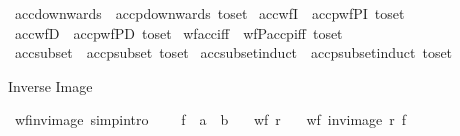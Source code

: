 \begin{isabellebody}
\isamarkupfalse%
\ acc{\isacharunderscore}{\kern0pt}downwards\ {\isacharequal}{\kern0pt}\ accp{\isacharunderscore}{\kern0pt}downwards\ {\isacharbrackleft}{\kern0pt}to{\isacharunderscore}{\kern0pt}set{\isacharbrackright}{\kern0pt}\isanewline
{}\isamarkupfalse%
\ acc{\isacharunderscore}{\kern0pt}wfI\ {\isacharequal}{\kern0pt}\ accp{\isacharunderscore}{\kern0pt}wfPI\ {\isacharbrackleft}{\kern0pt}to{\isacharunderscore}{\kern0pt}set{\isacharbrackright}{\kern0pt}\isanewline
{}\isamarkupfalse%
\ acc{\isacharunderscore}{\kern0pt}wfD\ {\isacharequal}{\kern0pt}\ accp{\isacharunderscore}{\kern0pt}wfPD\ {\isacharbrackleft}{\kern0pt}to{\isacharunderscore}{\kern0pt}set{\isacharbrackright}{\kern0pt}\isanewline
{}\isamarkupfalse%
\ wf{\isacharunderscore}{\kern0pt}acc{\isacharunderscore}{\kern0pt}iff\ {\isacharequal}{\kern0pt}\ wfP{\isacharunderscore}{\kern0pt}accp{\isacharunderscore}{\kern0pt}iff\ {\isacharbrackleft}{\kern0pt}to{\isacharunderscore}{\kern0pt}set{\isacharbrackright}{\kern0pt}\isanewline
{}\isamarkupfalse%
\ acc{\isacharunderscore}{\kern0pt}subset\ {\isacharequal}{\kern0pt}\ accp{\isacharunderscore}{\kern0pt}subset\ {\isacharbrackleft}{\kern0pt}to{\isacharunderscore}{\kern0pt}set{\isacharbrackright}{\kern0pt}\isanewline
{}\isamarkupfalse%
\ acc{\isacharunderscore}{\kern0pt}subset{\isacharunderscore}{\kern0pt}induct\ {\isacharequal}{\kern0pt}\ accp{\isacharunderscore}{\kern0pt}subset{\isacharunderscore}{\kern0pt}induct\ {\isacharbrackleft}{\kern0pt}to{\isacharunderscore}{\kern0pt}set{\isacharbrackright}{\kern0pt}%
\isadelimdocument
%
\endisadelimdocument
%
\isatagdocument
%
\isamarkuptrue%
%
\endisatagdocument
{\isafolddocument}%
%
\isadelimdocument
%
\endisadelimdocument
%
\begin{isamarkuptext}%
Inverse Image%
\end{isamarkuptext}\isamarkuptrue%
\isamarkupfalse%
\ wf{\isacharunderscore}{\kern0pt}inv{\isacharunderscore}{\kern0pt}image\ {\isacharbrackleft}{\kern0pt}simp{\isacharcomma}{\kern0pt}intro{\isacharbang}{\kern0pt}{\isacharbrackright}{\kern0pt}{\isacharcolon}{\kern0pt}\ \isanewline
\ \ \ f\ {\isacharcolon}{\kern0pt}{\isacharcolon}{\kern0pt}\ {\isachardoublequoteopen}{\isacharprime}{\kern0pt}a\ {\isasymRightarrow}\ {\isacharprime}{\kern0pt}b{\isachardoublequoteclose}\isanewline
\ \ \ {\isachardoublequoteopen}wf\ r{\isachardoublequoteclose}\isanewline
\ \ \ {\isachardoublequoteopen}wf\ {\isacharparenleft}{\kern0pt}inv{\isacharunderscore}{\kern0pt}image\ r\ f{\isacharparenright}{\kern0pt}{\isachardoublequoteclose}\isanewline

\end{isabellebody}
